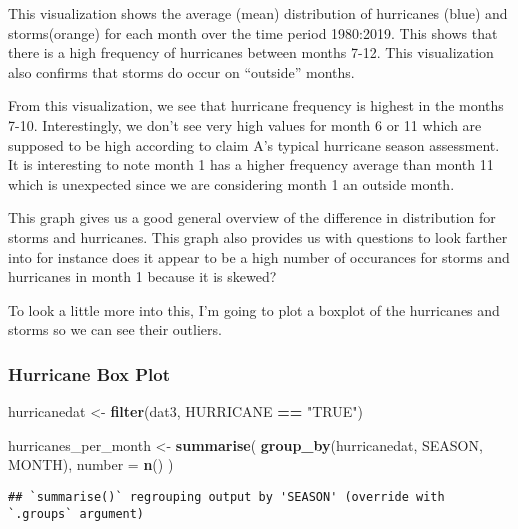 \documentclass[
]{article}
\newenvironment{Shaded}{\begin{snugshade}}{\end{snugshade}}
\newcommand{\DataTypeTok}[1]{\textcolor[rgb]{0.13,0.29,0.53}{#1}}
\newcommand{\KeywordTok}[1]{\textcolor[rgb]{0.13,0.29,0.53}{\textbf{#1}}}
\newcommand{\NormalTok}[1]{#1}
\newcommand{\OperatorTok}[1]{\textcolor[rgb]{0.81,0.36,0.00}{\textbf{#1}}}
\newcommand{\StringTok}[1]{\textcolor[rgb]{0.31,0.60,0.02}{#1}}
\begin{document}
This visualization shows the average (mean) distribution of hurricanes
(blue) and storms(orange) for each month over the time period 1980:2019.
This shows that there is a high frequency of hurricanes between months
7-12. This visualization also confirms that storms do occur on
``outside'' months.

From this visualization, we see that hurricane frequency is highest in
the months 7-10. Interestingly, we don't see very high values for month
6 or 11 which are supposed to be high according to claim A's typical
hurricane season assessment. It is interesting to note month 1 has a
higher frequency average than month 11 which is unexpected since we are
considering month 1 an outside month.

This graph gives us a good general overview of the difference in
distribution for storms and hurricanes. This graph also provides us with
questions to look farther into for instance does it appear to be a high
number of occurances for storms and hurricanes in month 1 because it is
skewed?

To look a little more into this, I'm going to plot a boxplot of the
hurricanes and storms so we can see their outliers.

\hypertarget{hurricane-box-plot}{%
\subsubsection{Hurricane Box Plot}\label{hurricane-box-plot}}

\begin{Shaded}
\begin{Highlighting}[]
\NormalTok{hurricanedat <-}\StringTok{ }\KeywordTok{filter}\NormalTok{(dat3, HURRICANE }\OperatorTok{==}\StringTok{ "TRUE"}\NormalTok{)}

\NormalTok{hurricanes_per_month <-}\StringTok{ }\KeywordTok{summarise}\NormalTok{(}
  \KeywordTok{group_by}\NormalTok{(hurricanedat, SEASON, MONTH),}
  \DataTypeTok{number =} \KeywordTok{n}\NormalTok{()}
\NormalTok{)}
\end{Highlighting}
\end{Shaded}

\begin{verbatim}
## `summarise()` regrouping output by 'SEASON' (override with `.groups` argument)
\end{verbatim}
\end{document}
